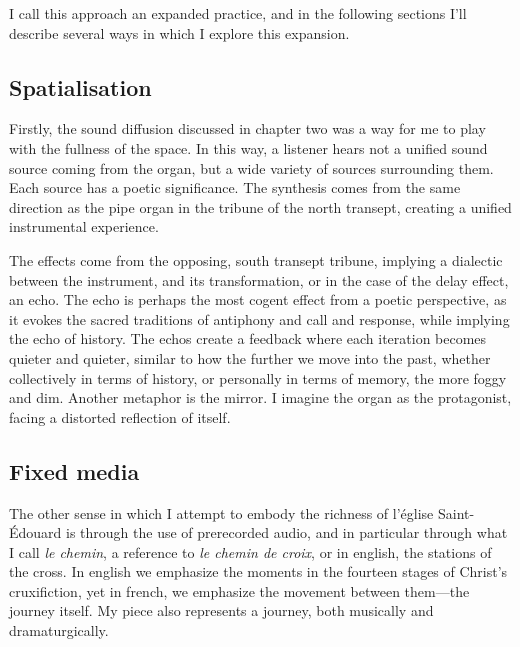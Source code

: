 \documentclass[12pt,twoside,maitrise]{dms_ks}
\theoremstyle{definition}
\begin{document}
{{I call this approach an expanded practice, and in the following sections I'll describe several ways in which I explore this expansion.

\subsection{Spatialisation}

Firstly, the sound diffusion discussed in chapter two was a way for me to play with the fullness of the space. 
In this way, a listener hears not a unified sound source coming from the organ, but a wide variety of sources surrounding them. 
Each source has a poetic significance. 
The synthesis comes from the same direction as the pipe organ in the tribune of the north transept, creating a unified instrumental experience.

The effects come from the opposing, south transept tribune, implying a dialectic between the instrument, and its transformation, or in the case of the delay effect, an echo. 
The echo is perhaps the most cogent effect from a poetic perspective, as it evokes the sacred traditions of antiphony and call and response, while implying the echo of history. 
The echos create a feedback where each iteration becomes quieter and quieter, similar to how the further we move into the past, whether collectively in terms of history, or personally in terms of memory, the more foggy and dim. 
Another metaphor is the mirror. 
I imagine the organ as the protagonist, facing a distorted reflection of itself.

\subsection{Fixed media}

The other sense in which I attempt to embody the richness of l'église Saint-Édouard is through the use of prerecorded audio, and in particular through what I call \textit{le chemin}, a reference to \textit{le chemin de croix}, or in english, the stations of the cross. 
In english we emphasize the moments in the fourteen stages of Christ's cruxifiction, yet in french, we emphasize the movement between them---the journey itself. 
My piece also represents a journey, both musically and dramaturgically. 

}}
\end{document}
